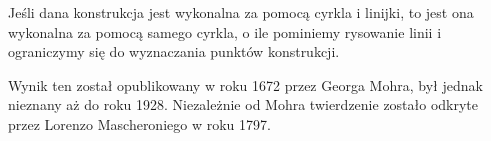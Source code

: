 \begin{theorem}
    Jeśli dana konstrukcja jest wykonalna za pomocą cyrkla i linijki, to jest ona wykonalna za pomocą samego cyrkla, o ile pominiemy rysowanie linii i ograniczymy się do wyznaczania punktów konstrukcji.
\end{theorem}

Wynik ten został opublikowany w roku 1672 przez Georga Mohra, był jednak nieznany aż do roku 1928. Niezależnie od Mohra twierdzenie zostało odkryte przez Lorenzo Mascheroniego w roku 1797.